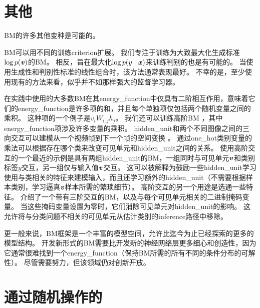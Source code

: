 
\section{其他}
\label{sec:other_boltzmann_machines}
\gls{BM}的许多其他变种是可能的。

\gls{BM}可以用不同的训练\gls{criterion}扩展。
我们专注于训练为大致最大化生成标准$\log p(\boldsymbol{\mathit{v}})$的\gls{BM}。
相反，旨在最大化$\log p(y \mid \boldsymbol{\mathit{x}})$来训练判别的也是有可能的\citep{Larochelle+Bengio-2008-small}。
当使用生成性和判别性标准的线性组合时，该方法通常表现最好。
不幸的是，至少使用现有的方法来看，似乎并不如那样强大的监督学习器。

在实践中使用的大多数\gls{BM}在其\gls{energy_function}中仅具有二阶相互作用，意味着它们的\gls{energy_function}是许多项的和，并且每个单独项仅包括两个随机变量之间的乘积。
这种项的一个例子是$v_iW_{i,j}h_j$。
我们还可以训练高阶\gls{BM}\citep{sejnowski1987higher} ，其中\gls{energy_function}项涉及许多变量的乘积。
\gls{hidden_unit}和两个不同图像之间的三向交互可以建模从一个视频帧到下一个帧的空间变换 \citep{Memisevic+Hinton-2007,Memisevic+Hinton-2010}。
通过\gls{one_hot}类别变量的乘法可以根据存在哪个类来改变可见单元和\gls{hidden_unit}之间的关系\citep{Nair2009}。
使用高阶交互的一个最近的示例是具有两组\gls{hidden_unit}的\gls{BM}，一组同时与可见单元$\boldsymbol{\mathit{v}}$和类别标签$y$交互，另一组仅与输入值$\boldsymbol{\mathit{v}}$交互\citep{luo2011learning}。 %
这可以被解释为鼓励一些\gls{hidden_unit}学习使用与类相关的特征来建模输入，而且还学习额外的\gls{hidden_unit}（不需要根据样本类别，学习逼真$\boldsymbol{\mathit{v}}$样本所需的繁琐细节）。
高阶交互的另一个用途是选通一些特征。
\citet{Sohn-et-al-ICML2013} 介绍了一个带有三阶交互的\gls{BM}，以及与每个可见单元相关的二进制掩码变量。
当这些掩码变量设置为零时，它们消除可见单元对\gls{hidden_unit}的影响。
这允许将与分类问题不相关的可见单元从估计类别的\gls{inference}路径中移除。

更一般来说，\gls{BM}框架是一个丰富的模型空间，允许比迄今为止已经探索的更多的模型结构。
开发新形式的\gls{BM}需要比开发新的神经网络层更多细心和创造性，因为它通常很难找到一个\gls{energy_function}（保持\gls{BM}所需的所有不同的条件分布的可解性）。
尽管需要努力，但该领域仍对创新开放。


\section{通过随机操作的}
\label{sec:back_propagation_through_random_operations}


